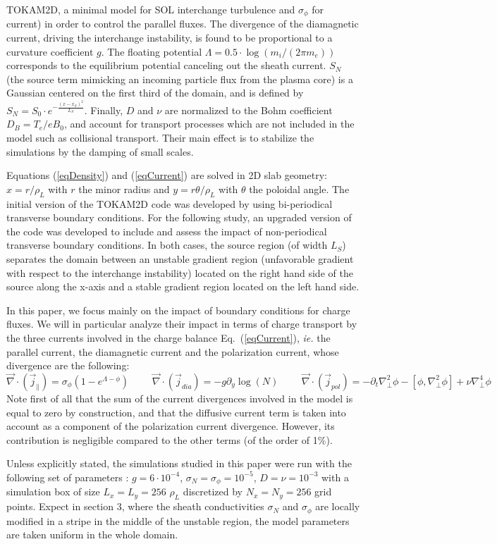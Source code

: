 \documentclass[a4paper,12pt]{article} %
\begin{document}
\begin{section}{TOKAM2D, a minimal model for SOL interchange turbulence}
and $\sigma_\phi$ for current) in order to control the parallel fluxes. The divergence of the diamagnetic 
current, driving the interchange instability, is found to be proportional to a curvature coefficient $g$. 
The floating potential $\Lambda=0.5\cdot\log(m_i/(2\pi m_e))$ corresponds to the equilibrium 
potential canceling out the sheath current. $S_N$ (the source term mimicking an incoming particle flux 
from the plasma core) is a Gaussian centered on the first third of the domain, and 
is defined by $S_N=S_0\cdot e^{-\frac{(x-x_S)^2}{L_S}}$. 
Finally, $D$ and $\nu$ are normalized to the 
Bohm coefficient $D_B=T_e/eB_0$, and account for transport processes which are not included in the model such as 
collisional transport. Their main effect is to stabilize the simulations by the damping of small scales. 

Equations (\ref{eqDensity}) and (\ref{eqCurrent}) are solved in 2D slab geometry: 
$x=r/\rho_L$ with $r$ the minor radius and $y=r\theta/\rho_L$ with $\theta$ the poloidal angle.
The initial version of the TOKAM2D code was developed by using bi-periodical transverse boundary conditions.
For the following study, an upgraded version of the code was developed to 
include and assess the impact of non-periodical transverse boundary conditions. In both cases, the source region 
(of width $L_S$) separates the domain between an unstable gradient region 
(unfavorable gradient with respect to the interchange instability) located on the right hand side of the source
along the x-axis and a stable gradient region located on the left hand side.

In this paper, we focus mainly on the impact of boundary conditions for charge fluxes. We will in particular 
analyze their impact in terms of charge transport by the three currents involved in the charge 
balance Eq.~(\ref{eqCurrent}), \emph{ie.} the parallel current, the diamagnetic current and the polarization current, 
whose divergence are the following:
$$\vec{\nabla}\cdot\left(\vec{j}_\parallel\right)=\sigma_\phi (1-e^{\Lambda-\phi})\text{~~~~~~~}
  \vec{\nabla}\cdot\left(\vec{j}_{dia}\right)=-g\partial_y\log(N)\text{~~~~~~~}
  \vec{\nabla}\cdot\left(\vec{j}_{pol}\right)=-\partial_t\nabla^2_\perp \phi-\left[\phi,\nabla^2_\perp \phi\right]
  +\nu\nabla^4_\perp \phi$$
Note first of all that the sum of the current divergences involved in the model is equal to zero by construction, 
and that the diffusive current term is taken into account as a component of the polarization current divergence. 
However, its contribution is negligible compared to the other terms (of the order of 1\%).

Unless explicitly stated, the simulations studied in this paper were run with the following set of parameters : 
$g=6\cdot 10^{-4}$, $\sigma_N=\sigma_\phi=10^{-5}$, $D=\nu=10^{-3}$ with a simulation box of size 
$L_x=L_y=256\text{~}\rho_L$ discretized 
by $N_x=N_y=256$ grid points. 
Expect in section 3, where the sheath conductivities $\sigma_N$ and $\sigma_\phi$ are locally modified in a stripe in the
middle of the unstable region, the model parameters are taken uniform in the whole domain.
\end{section}
\end{document}
